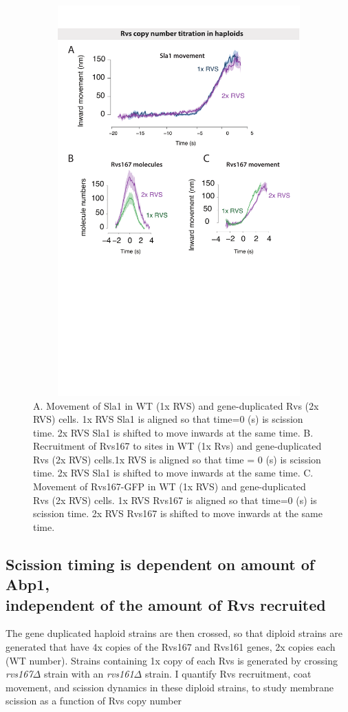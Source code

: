 			\begin{figure}[h]
			\centering
			\includegraphics[width=15cm,height=15cm,keepaspectratio]{figures/results_final/rvs_haploid}
			\caption[Overexpression of the Rvs complex in haploid cells]
			{A. Movement of Sla1 in WT (1x RVS) and gene-duplicated Rvs (2x RVS) cells. 1x RVS Sla1 is aligned so that time=0 (s) is scission time. 2x RVS Sla1 is shifted to move inwards at the same time.
			B. Recruitment of Rvs167 to sites in WT (1x Rvs)  and gene-duplicated Rvs (2x RVS) cells.1x RVS is aligned so that time = 0 (s) is scission time. 2x RVS Sla1 is shifted to move inwards at the same time.
			C.  Movement of Rvs167-GFP in WT (1x RVS) and gene-duplicated Rvs (2x RVS) cells. 1x RVS Rvs167 is aligned so that time=0 (s) is scission time. 2x RVS Rvs167 is shifted to move inwards at the same time.
			 \label{fig_rvshaploid}}
			\end{figure}	
		

	

	\subsection{Scission timing is dependent on amount of Abp1, \\
	independent of the amount of Rvs recruited}
	\vspace{5mm}
	The gene duplicated haploid strains are then crossed, so that diploid strains are generated that have 4x copies of the Rvs167 and Rvs161 genes, 2x copies each (WT number). Strains containing 1x copy of each Rvs is generated by crossing \textit{rvs167$\Delta$} strain with an \textit{rvs161$\Delta$} strain. I quantify Rvs recruitment, coat movement, and scission dynamics in these diploid strains, to study membrane scission as a function of Rvs copy number
	
